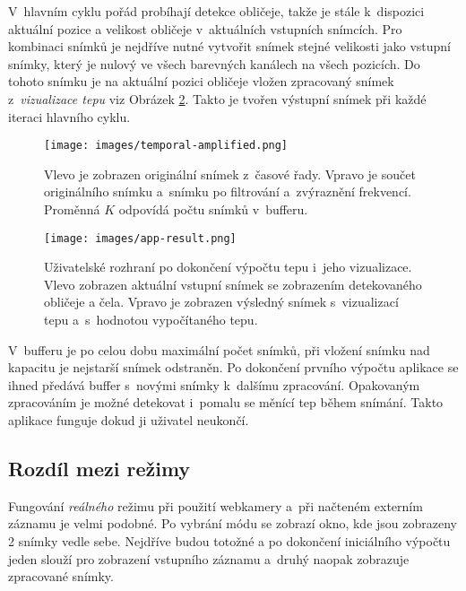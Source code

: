 \documentclass[
  digital, %
  table,   %
%
  lof,     %
  lot,     %
]{fithesis3}
\begin{document}
V~hlavním cyklu pořád probíhají detekce obličeje, takže je stále k~dispozici aktuální pozice a velikost obličeje v~aktuálních vstupních snímcích. Pro kombinaci snímků je nejdříve nutné vytvořit snímek stejné velikosti jako vstupní snímky, který je nulový ve všech barevných kanálech na všech pozicích. Do tohoto snímku je na aktuální pozici obličeje vložen zpracovaný snímek z~\emph{vizualizace tepu} viz Obrázek \ref{fig:app-result}. Takto je tvořen výstupní snímek při každé iteraci hlavního cyklu.

\begin{figure}
  \begin{center}
    \texttt{[image: images/temporal-amplified.png]}
  \end{center}
  \caption{Vlevo je zobrazen originální snímek z~časové řady. Vpravo je součet originálního snímku a~snímku po filtrování a~zvýraznění frekvencí. Proměnná $K$ odpovídá počtu snímků v~bufferu.}
  \label{fig:temporal-amplified}
\end{figure}

\begin{figure}[t]
  \begin{center}
    \texttt{[image: images/app-result.png]}
  \end{center}
  \caption{Uživatelské rozhraní po dokončení výpočtu tepu i~jeho vizualizace. Vlevo zobrazen aktuální vstupní snímek se zobrazením detekovaného obličeje a čela. Vpravo je zobrazen výsledný snímek s~vizualizací tepu a~s~hodnotou vypočítaného tepu.}
  \label{fig:app-result}
\end{figure}
 
V~bufferu je po celou dobu maximální počet snímků, při vložení snímku nad kapacitu je nejstarší snímek odstraněn. Po dokončení prvního výpočtu aplikace se ihned předává buffer s~novými snímky k~dalšímu zpracování. Opakovaným zpracováním je možné detekovat i~pomalu se měnící tep během snímání. Takto aplikace funguje dokud ji uživatel neukončí. 

\subsection{Rozdíl mezi režimy}
Fungování \emph{reálného} režimu při použití webkamery a~při načteném externím záznamu je velmi podobné. Po vybrání módu se zobrazí okno, kde jsou zobrazeny 2 snímky vedle sebe. Nejdříve budou totožné a po dokončení iniciálního výpočtu jeden slouží pro zobrazení vstupního záznamu a~druhý naopak zobrazuje zpracované snímky.
\end{document}
